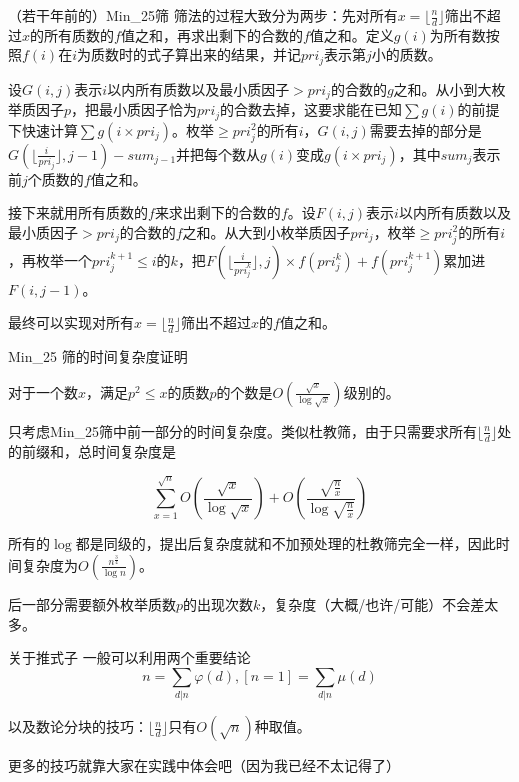 \documentclass{beamer}
\begin{document}
\begin{frame}{（若干年前的）Min\_25筛}
	筛法的过程大致分为两步：先对所有$x=\lfloor\frac nd\rfloor$筛出不超过$x$的所有质数的$f$值之和，再求出剩下的合数的$f$值之和。定义$g(i)$为所有数按照$f(i)$在$i$为质数时的式子算出来的结果，并记$pri_j$表示第$j$小的质数。
	
	设$G(i,j)$表示$i$以内所有质数以及最小质因子$>pri_j$的合数的$g$之和。从小到大枚举质因子$p$，把最小质因子恰为$pri_j$的合数去掉，这要求能在已知$\sum g(i)$的前提下快速计算$\sum g(i\times pri_j)$。枚举$\ge pri_j^2$的所有$i$，$G(i,j)$需要去掉的部分是$G(\lfloor \frac{i}{pri_j} \rfloor,j-1)-sum_{j-1}$并把每个数从$g(i)$变成$g(i\times pri_j)$，其中$sum_j$表示前$j$个质数的$f$值之和。
	
	接下来就用所有质数的$f$来求出剩下的合数的$f$。设$F(i,j)$表示$i$以内所有质数以及最小质因子$>pri_j$的合数的$f$之和。从大到小枚举质因子$pri_j$，枚举$\ge pri_j^2$的所有$i$，再枚举一个$pri_j^{k+1}\le i$的$k$，把$F(\lfloor\frac {i}{pri_j^k}\rfloor,j) \times f(pri_j^k) + f(pri_j^{k+1})$累加进$F(i,j-1)$。
	
	最终可以实现对所有$x=\lfloor\frac nd\rfloor$筛出不超过$x$的$f$值之和。
	
\end{frame}
\begin{frame}{Min\_25 筛的时间复杂度证明}
	
	对于一个数$x$，满足$p^2 \le x$的质数$p$的个数是$O(\frac{\sqrt x}{\log \sqrt x})$级别的。
	
	只考虑Min\_25筛中前一部分的时间复杂度。类似杜教筛，由于只需要求所有$\lfloor\frac{n}{d}\rfloor$处的前缀和，总时间复杂度是
	
	$$\sum_{x=1}^{\sqrt n}O\left(\frac{\sqrt x}{\log \sqrt x}\right)+O\left(\frac{\sqrt{\frac nx}}{\log \sqrt{\frac nx}}\right)$$
	
	所有的$\log$都是同级的，提出后复杂度就和不加预处理的杜教筛完全一样，因此时间复杂度为$O\left(\frac{n^{\frac 34}}{\log n}\right)$。
	
	后一部分需要额外枚举质数$p$的出现次数$k$，复杂度（大概/也许/可能）不会差太多。
	
\end{frame}

\begin{frame}{关于推式子}
	一般可以利用两个重要结论$$n = \sum_{d | n}\varphi(d), [n = 1] = \sum_{d | n}\mu(d)$$
	
	以及数论分块的技巧：$\lfloor\frac{n}{d}\rfloor$只有$O(\sqrt n)$种取值。
	
	更多的技巧就靠大家在实践中体会吧（因为我已经不太记得了）
\end{frame}
\end{document}

